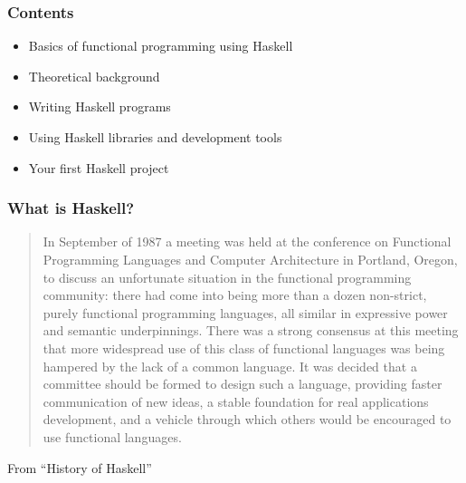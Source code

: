 \documentclass{beamer}
\begin{document}

\begin{frame}
  \frametitle{Contents}
  \begin{itemize}
  \item Basics of functional programming using Haskell
  \item Theoretical background
  \item Writing Haskell programs
  \item Using Haskell libraries and development tools
  \item Your first Haskell project
  \end{itemize}
\end{frame}


\begin{frame}
  \frametitle{What is Haskell?}
  \begin{quotation}
    In September of 1987 a meeting was held at the conference on
    Functional Programming Languages and Computer Architecture in
    Portland, Oregon, to discuss an unfortunate situation in the
    functional programming community: there had come into being more
    than a dozen non-strict, purely functional programming languages,
    all similar in expressive power and semantic underpinnings. There
    was a strong consensus at this meeting that more widespread use
    of this class of functional languages was being hampered by the
    lack of a common language. It was decided that a committee should
    be formed to design such a language, providing faster
    communication of new ideas, a stable foundation for real
    applications development, and a vehicle through which others would 
    be encouraged to use functional languages. 
  \end{quotation}
  {\tiny From ``History of Haskell''}
\end{frame}
\end{document}

